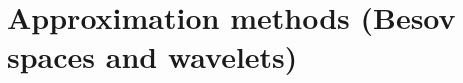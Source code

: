 \documentclass{beamer}
\numberwithin{equation}{section}
\theoremstyle{plain}
\theoremstyle{plain}
\theoremstyle{definition}
\theoremstyle{plain}
\theoremstyle{plain}
\theoremstyle{definition}
\newcommand{\Rl}{\mathbb{R}}
\newcommand{\Cplx}{\mathbb{C}}
\newcommand{\Itgr}{\mathbb{Z}}
\newcommand{\Lc}{\mathcal{L}}
\newcommand{\mf}{\mathfrak{m}}
\begin{document}
%
%
%

\section{Approximation methods (Besov spaces and wavelets)}\label{section_wavelets}
\end{document}
